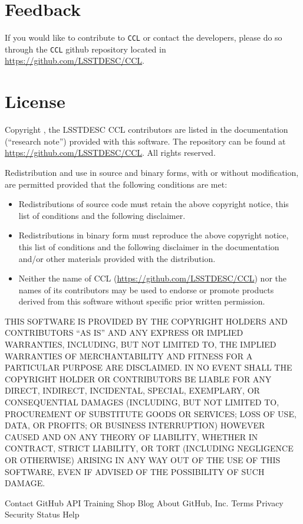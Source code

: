 \documentclass[\docopts]{\docclass}
\begin{document}
\section{Feedback}
\label{sec:feedback}

If you would like to contribute to {\tt CCL} or contact the developers, please do so through the {\tt CCL} github repository located in \url{https://github.com/LSSTDESC/CCL}.

\section{License}
\label{sec:license}

Copyright , the LSSTDESC CCL contributors are listed in the
documentation (``research note'') provided with this software. The repository can be found at \url{https://github.com/LSSTDESC/CCL}. All rights reserved.

Redistribution and use in source and binary forms, with or without
modification, are permitted provided that the following conditions are met:

\begin{itemize}
\item Redistributions of source code must retain the above copyright notice, this
  list of conditions and the following disclaimer.
\item Redistributions in binary form must reproduce the above copyright notice,
  this list of conditions and the following disclaimer in the documentation
  and/or other materials provided with the distribution.
\item Neither the name of CCL (\url{https://github.com/LSSTDESC/CCL}) nor the names of its
  contributors may be used to endorse or promote products derived from
  this software without specific prior written permission.
\end{itemize}

THIS SOFTWARE IS PROVIDED BY THE COPYRIGHT HOLDERS AND CONTRIBUTORS ``AS IS''
AND ANY EXPRESS OR IMPLIED WARRANTIES, INCLUDING, BUT NOT LIMITED TO, THE
IMPLIED WARRANTIES OF MERCHANTABILITY AND FITNESS FOR A PARTICULAR PURPOSE ARE
DISCLAIMED. IN NO EVENT SHALL THE COPYRIGHT HOLDER OR CONTRIBUTORS BE LIABLE
FOR ANY DIRECT, INDIRECT, INCIDENTAL, SPECIAL, EXEMPLARY, OR CONSEQUENTIAL
DAMAGES (INCLUDING, BUT NOT LIMITED TO, PROCUREMENT OF SUBSTITUTE GOODS OR
SERVICES; LOSS OF USE, DATA, OR PROFITS; OR BUSINESS INTERRUPTION) HOWEVER
CAUSED AND ON ANY THEORY OF LIABILITY, WHETHER IN CONTRACT, STRICT LIABILITY,
OR TORT (INCLUDING NEGLIGENCE OR OTHERWISE) ARISING IN ANY WAY OUT OF THE USE
OF THIS SOFTWARE, EVEN IF ADVISED OF THE POSSIBILITY OF SUCH DAMAGE.

Contact GitHub API Training Shop Blog About  GitHub, Inc. Terms Privacy Security Status Help








\end{document}
